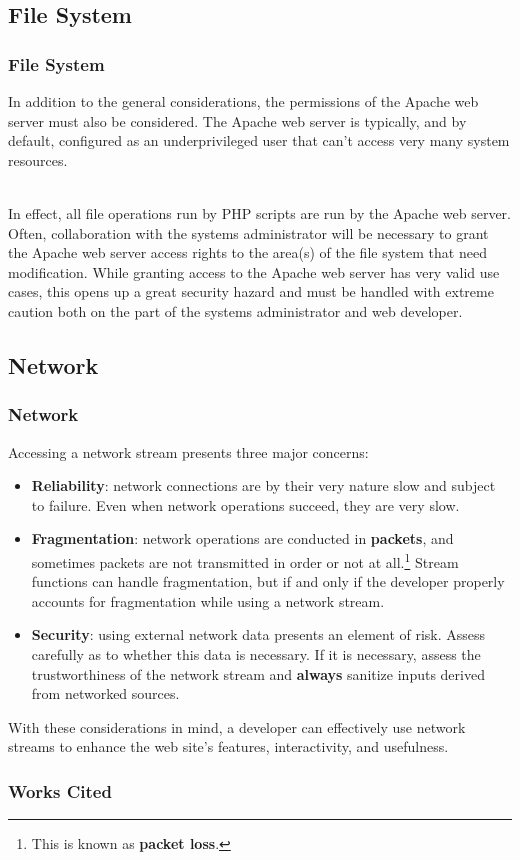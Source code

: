 \documentclass[aspectratio=169]{beamer}
\begin{document}
\subsection{File System}
\begin{frame}
\frametitle{File System}
In addition to the general considerations, the permissions of the Apache web server must also be considered. The Apache web server is typically, and by default, configured as an underprivileged user that can't access very many system resources.

\mbox{}\\
In effect, all file operations run by PHP scripts are run by the Apache web server. Often, collaboration with the systems administrator will be necessary to grant the Apache web server access rights to the area(s) of the file system that need modification. While granting access to the Apache web server has very valid use cases, this opens up a great security hazard and must be handled with extreme caution both on the part of the systems administrator and web developer.
\end{frame}

\subsection{Network}
\begin{frame}
\frametitle{Network}
Accessing a network stream presents three major concerns:
\begin{itemize}
	\item \textbf{Reliability}: network connections are by their very nature slow and subject to failure. Even when network operations succeed, they are very slow. \cite{latency, human-latency}
	\item \textbf{Fragmentation}: network operations are conducted in \textbf{packets}, and sometimes packets are not transmitted in order or not at all.\footnote{This is known as \textbf{packet loss}.} Stream functions can handle fragmentation, but if and only if the developer properly accounts for fragmentation while using a network stream.
	\item \textbf{Security}: using external network data presents an element of risk. Assess carefully as to whether this data is necessary. If it is necessary, assess the trustworthiness of the network stream and \textbf{always} sanitize inputs derived from networked sources.
\end{itemize}
With these considerations in mind, a developer can effectively use network streams to enhance the web site's features, interactivity, and usefulness.
\end{frame}

\begin{frame}[allowframebreaks]
\frametitle{Works Cited}

\end{frame}
\end{document}
